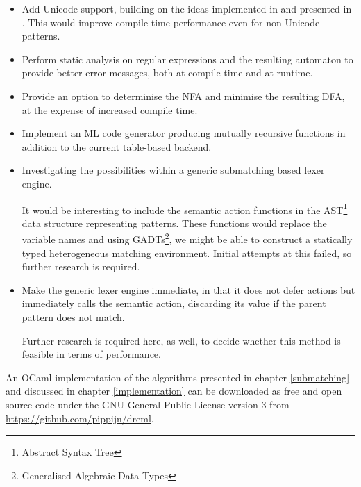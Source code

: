 \begin{itemize}

   \item Add Unicode support, building on the ideas implemented in \mlulex{} and
      presented in \cite{re-deriv}. This would improve compile time performance
      even for non-Unicode patterns.

   \item Perform static analysis on regular expressions and the resulting
      automaton to provide better error messages, both at compile time and at
      runtime.

   \item Provide an option to determinise the NFA and minimise the resulting
      DFA, at the expense of increased compile time.

   \item Implement an ML code generator producing mutually recursive functions
      in addition to the current table-based backend.

   \item Investigating the possibilities within a generic submatching based
      lexer engine.

      It would be interesting to include the semantic action functions in the
      AST\footnote{Abstract Syntax Tree} data structure representing patterns.
      These functions would replace the variable names and using
      GADTs\footnote{Generalised Algebraic Data Types}, we might be able to
      construct a statically typed heterogeneous matching environment. Initial
      attempts at this failed, so further research is required.

   \item Make the generic lexer engine immediate, in that it does not defer
      actions but immediately calls the semantic action, discarding its value if
      the parent pattern does not match.

      Further research is required here, as well, to decide whether this method
      is feasible in terms of performance.

\end{itemize}

An OCaml implementation of the algorithms presented in chapter \ref{submatching}
and discussed in chapter \ref{implementation} can be downloaded as free and open
source code under the GNU General Public License version 3 from
\url{https://github.com/pippijn/dreml}.


